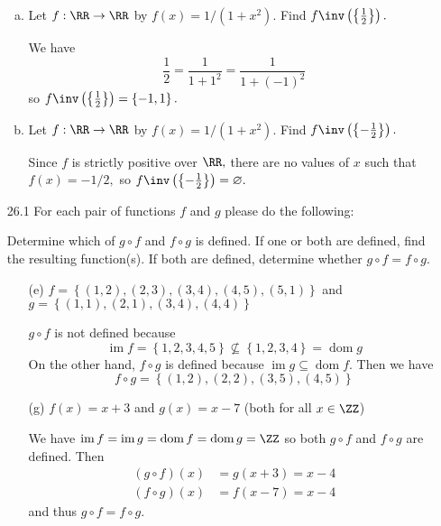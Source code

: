 \documentclass{article}
\DeclareMathOperator{\ima}{im}
\DeclareMathOperator{\dom}{dom}
\begin{document}
\begin{itemize}
\begin{enumerate}[(a)]
			\item Let $f:\RR\to\RR$ by $f(x)=1/(1+x^2).$ Find $f\inv\left( \left\{ \frac{1}{2} \right\} \right).$
				\begin{answer*}
					We have
					\[\frac{1}{2} = \frac{1}{1+1^2} = \frac{1}{1+(-1)^2}\]
					so $f\inv\left( \left\{ \frac{1}{2} \right\} \right) = \left\{ -1, 1 \right\}.$
				\end{answer*}

			\item Let $f:\RR\to\RR$ by $f(x)=1/(1+x^2).$ Find $f\inv\left( \left\{ -\frac{1}{2} \right\} \right).$
				\begin{answer*}
					Since $f$ is strictly positive over $\RR,$ there are no values of $x$ such that $f(x)=-1/2,$ so $f\inv\left( \left\{ -\frac{1}{2} \right\} \right)=\varnothing.$
				\end{answer*}
				
		\end{enumerate}

	\item[26.1] For each pair of functions $f$ and $g$ please do the following:
		\begin{itemize}
			\ii Determine which of $g\circ f$ and $f\circ g$ is defined.
			\ii If one or both are defined, find the resulting function(s).
			\ii If both are defined, determine whether $g\circ f=f\circ g.$
		\end{itemize}
		\begin{itemize}
			\item[(e)] $f=\left\{ (1, 2), (2,  3), (3, 4), (4, 5), (5, 1) \right\}$ and $g=\left\{ (1, 1), (2, 1), (3, 4), (4, 4) \right\}$
				\begin{soln}
					$g\circ f$ is not defined because
					\[\ima f = \left\{ 1, 2, 3, 4, 5 \right\}\nsubseteq\left\{ 1, 2, 3, 4 \right\} = \dom g\]
					On the other hand, $f\circ g$ is defined because $\ima g\subseteq \dom f.$ Then we have
					\[f\circ g=\left\{ (1, 2), (2, 2), (3, 5), (4, 5) \right\}\]
				\end{soln}

			\item[(g)] $f(x)=x+3$ and $g(x)=x-7$ (both for all $x\in\ZZ$)
				\begin{soln}
					We have $\ima f=\ima g=\dom f=\dom g=\ZZ$ so both $g\circ f$ and $f\circ g$ are defined. Then
					\begin{align*}
						(g\circ f)(x) &= g(x+3) = x-4 \\
						(f\circ g)(x) &= f(x-7) = x-4
					\end{align*}
					and thus $g\circ f = f\circ g.$
				\end{soln}


\end{itemize}
\end{itemize}
\end{document}
